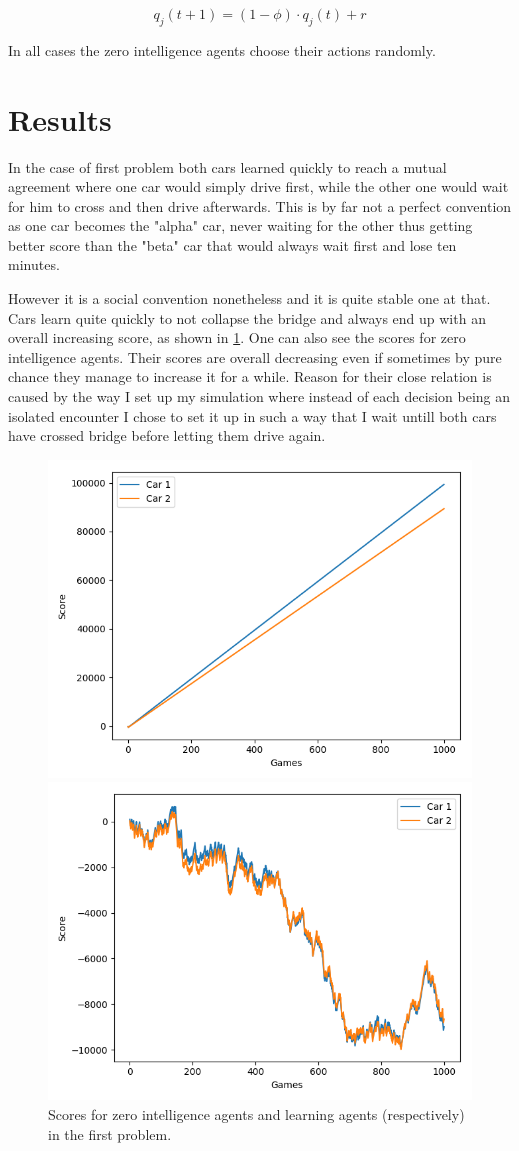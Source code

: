 \documentclass[conference]{IEEEtran}
\begin{document}
\begin{equation}
q_j(t+1) = (1-\phi) \cdot q_j(t) + r
\label{eq:ErevRoth}
\end{equation}

In all cases the zero intelligence agents choose their actions randomly.

\section{Results}
In the case of first problem both cars learned quickly to reach a mutual agreement where one car would simply drive first, while the other one would wait for him to cross and then drive afterwards. This is by far not a perfect convention as one car becomes the "alpha" car, never waiting for the other thus getting better score than the "beta" car that would always wait first and lose ten minutes. 

However it is a social convention nonetheless and it is quite stable one at that. Cars learn quite quickly to not collapse the bridge and always end up with an overall increasing score, as shown in \cref{fig:ScoresPart1}. One can also see the scores for zero intelligence agents. Their scores are overall decreasing even if sometimes by pure chance they manage to increase it for a while. Reason for their close relation is caused by the way I set up my simulation where instead of each decision being an isolated encounter I chose to set it up in such a way that I wait untill both cars have crossed bridge before letting them drive again.

\begin{figure}[htbp]
  \centerline{\includegraphics[width=.4\textwidth]{Part1_QLearning}}
  \centerline{\includegraphics[width=.4\textwidth]{Part1_Random}}
  \caption{Scores for zero intelligence agents and learning agents (respectively) in the first problem.}
  \label{fig:ScoresPart1}
\end{figure}
\end{document}
